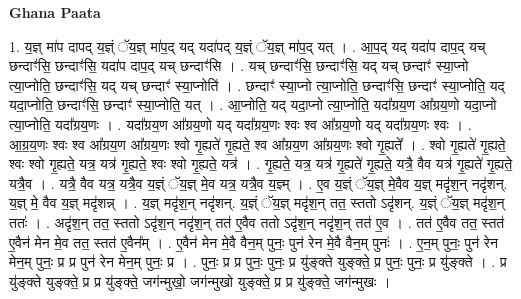 \documentclass[17pt]{extarticle}
\begin{document}
\textbf{Ghana Paata } \newline

1. य॒ज्ञ् मा॑प दापद् य॒ज्ञ्ं ॅय॒ज्ञ् मा॑प॒द् यद् यदा॑पद् य॒ज्ञ्ं ॅय॒ज्ञ् मा॑प॒द् यत् । . आ॒प॒द् यद् यदा॑प दाप॒द् यच् छन्दाꣳ॑सि॒ छन्दाꣳ॑सि॒ यदा॑प दाप॒द् यच् छन्दाꣳ॑सि । . यच् छन्दाꣳ॑सि॒ छन्दाꣳ॑सि॒ यद् यच् छन्दाꣳ॑ स्या॒प्नो त्या॒प्नोति॒ छन्दाꣳ॑सि॒ यद् यच् छन्दाꣳ॑ स्या॒प्नोति॑ । . छन्दाꣳ॑ स्या॒प्नो त्या॒प्नोति॒ छन्दाꣳ॑सि॒ छन्दाꣳ॑ स्या॒प्नोति॒ यद् यदा॒प्नोति॒ छन्दाꣳ॑सि॒ छन्दाꣳ॑ स्या॒प्नोति॒ यत् । . आ॒प्नोति॒ यद् यदा॒प्नो त्या॒प्नोति॒ यदा᳚ग्रय॒ण आ᳚ग्रय॒णो यदा॒प्नो त्या॒प्नोति॒ यदा᳚ग्रय॒णः । . यदा᳚ग्रय॒ण आ᳚ग्रय॒णो यद् यदा᳚ग्रय॒णः श्वः श्व आ᳚ग्रय॒णो यद् यदा᳚ग्रय॒णः श्वः । . आ॒ग्र॒य॒णः श्वः श्व आ᳚ग्रय॒ण आ᳚ग्रय॒णः श्वो गृ॒ह्यते॑ गृ॒ह्यते॒ श्व आ᳚ग्रय॒ण आ᳚ग्रय॒णः श्वो गृ॒ह्यते᳚ । . श्वो गृ॒ह्यते॑ गृ॒ह्यते॒ श्वः श्वो गृ॒ह्यते॒ यत्र॒ यत्र॑ गृ॒ह्यते॒ श्वः श्वो गृ॒ह्यते॒ यत्र॑ । . गृ॒ह्यते॒ यत्र॒ यत्र॑ गृ॒ह्यते॑ गृ॒ह्यते॒ यत्रै॒ वैव यत्र॑ गृ॒ह्यते॑ गृ॒ह्यते॒ यत्रै॒व । . यत्रै॒ वैव यत्र॒ यत्रै॒व य॒ज्ञ्ं ॅय॒ज्ञ् मे॒व यत्र॒ यत्रै॒व य॒ज्ञ्म् । . ए॒व य॒ज्ञ्ं ॅय॒ज्ञ् मे॒वैव य॒ज्ञ् मदृ॑श॒न् नदृ॑शन्. य॒ज्ञ् मे॒ वैव य॒ज्ञ् मदृ॑शन्न् । . य॒ज्ञ् मदृ॑श॒न् नदृ॑शन्. य॒ज्ञ्ं ॅय॒ज्ञ् मदृ॑श॒न् तत॒ स्ततो ऽदृ॑शन्. य॒ज्ञ्ं ॅय॒ज्ञ् मदृ॑श॒न् ततः॑ । . अदृ॑श॒न् तत॒ स्ततो ऽदृ॑श॒न् नदृ॑श॒न् तत॑ ए॒वैव ततो ऽदृ॑श॒न् नदृ॑श॒न् तत॑ ए॒व । . तत॑ ए॒वैव तत॒ स्तत॑ ए॒वैन॑ मेन मे॒व तत॒ स्तत॑ ए॒वैन᳚म् । . ए॒वैन॑ मेन मे॒वै वैन॒म् पुनः॒ पुन॑ रेन मे॒वै वैन॒म् पुनः॑ । . ए॒न॒म् पुनः॒ पुन॑ रेन मेन॒म् पुनः॒ प्र प्र पुन॑ रेन मेन॒म् पुनः॒ प्र । . पुनः॒ प्र प्र पुनः॒ पुनः॒ प्र यु॑ङ्क्ते युङ्क्ते॒ प्र पुनः॒ पुनः॒ प्र यु॑ङ्क्ते । . प्र यु॑ङ्क्ते युङ्क्ते॒ प्र प्र यु॑ङ्क्ते॒ जग॑न्मुखो॒ जग॑न्मुखो युङ्क्ते॒ प्र प्र यु॑ङ्क्ते॒ जग॑न्मुखः । \newline
\end{document}
